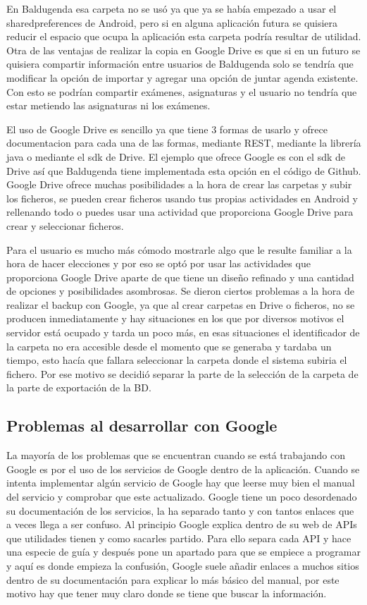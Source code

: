 En Baldugenda esa carpeta no se usó ya que ya se había empezado a usar el sharedpreferences de Android, pero si en alguna aplicación futura se quisiera reducir el espacio que ocupa la aplicación esta carpeta podría resultar de utilidad.
Otra de las ventajas de realizar la copia en Google Drive es que si en un futuro se quisiera compartir información entre usuarios de Baldugenda solo se tendría que modificar la opción de importar y agregar una opción de juntar agenda existente. Con esto se podrían compartir exámenes, asignaturas y el usuario no tendría que estar metiendo las asignaturas ni los exámenes.

El uso de Google Drive es sencillo ya que tiene 3 formas de usarlo y ofrece documentacion para cada una de las formas, mediante REST, mediante la librería java o mediante el sdk de Drive.
El ejemplo que ofrece Google es con el sdk de Drive así que Baldugenda tiene implementada esta opción en el código de Github.
Google Drive ofrece muchas posibilidades a la hora de crear las carpetas y subir los ficheros, se pueden crear ficheros usando tus propias actividades en Android y rellenando todo o puedes usar una actividad que proporciona Google Drive para crear y seleccionar ficheros.

Para el usuario es mucho más cómodo mostrarle algo que le resulte familiar a la hora de hacer elecciones y por eso se optó por usar las actividades que proporciona Google Drive aparte de que tiene un diseño refinado y una cantidad de opciones y posibilidades asombrosas.
Se dieron ciertos problemas a la hora de realizar el backup con Google, ya que al crear carpetas en Drive o ficheros, no se producen inmediatamente y hay situaciones en los que por diversos motivos el servidor está ocupado y tarda un poco más, en esas situaciones el identificador de la carpeta no era accesible desde el momento que se generaba y tardaba un tiempo, esto hacía que fallara seleccionar la carpeta donde el sistema subiria el fichero.
Por ese motivo se decidió separar la parte de la selección de la carpeta de la parte de exportación de la BD.

\subsection{Problemas al desarrollar con Google}
\label{subsecc:Problemas al desarrollar con Google}

La mayoría de los problemas que se encuentran cuando se está trabajando con Google es por el uso de los servicios de Google dentro de la aplicación.
Cuando se intenta implementar algún servicio de Google hay que leerse muy bien el manual del servicio y comprobar que este actualizado. Google tiene un poco desordenado su documentación de los servicios, la ha separado tanto y con tantos enlaces que a veces llega a ser confuso.
Al principio Google explica dentro de su web de APIs que utilidades tienen y como sacarles partido. Para ello separa cada API y hace una especie de guía y después pone un apartado para que se empiece a programar y aquí es donde empieza la confusión, Google suele añadir enlaces a muchos sitios dentro de su documentación para explicar lo más básico del manual, por este motivo hay que tener muy claro donde se tiene que buscar la información.

